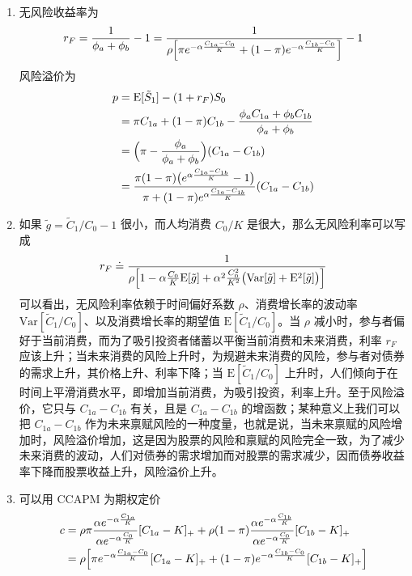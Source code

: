 \begin{solution}
\begin{enumerate}[label=(\alph*)]
\[\begin{aligned}
        \end{aligned}
    \]
    \item 无风险收益率为
    \[
        r_{F}=\frac{1}{\phi_{a}+\phi_{b}}-1=\frac{1}{\rho\Bigl[\pi e^{-\alpha\frac{C_{1a}-C_{0}}{K}}+(1-\pi)e^{-\alpha\frac{C_{1b}-C_{0}}{K}}\Bigr]}-1
    \]
    风险溢价为
    \[
        \begin{aligned}
            p&=\mathrm{E}[\tilde{S}_{1}]-(1+r_{F})S_{0}\\
            &=\pi C_{1a}+(1-\pi)C_{1b}-\frac{\phi_{a}C_{1a}+\phi_{b}C_{1b}}{\phi_{a}+\phi_{b}}\\
            &=\Bigl(\pi-\frac{\phi_{a}}{\phi_{a}+\phi_{b}}\Bigr)(C_{1a}-C_{1b})\\
            &=\frac{\pi(1-\pi)\bigl(e^{\alpha\frac{C_{1a}-C_{1b}}{K}}-1\bigr)}{\pi+(1-\pi)e^{\alpha\frac{C_{1a}-C_{1b}}{K}}}(C_{1a}-C_{1b})
        \end{aligned}
    \]
    \item 如果 $\tilde{g}=\tilde{C}_{1}/C_{0}-1$ 很小，而人均消费 $C_{0}/K$ 是很大，那么无风险利率可以写成
    \[
        r_{F}\doteq\frac{1}{\rho\Bigl[1-\alpha\frac{C_{0}}{K}\mathrm{E}[\tilde{g}]+\alpha^{2}\frac{C_{0}^{2}}{K^{2}}\bigl(\mathrm{Var}[\tilde{g}]+\mathrm{E}^{2}[\tilde{g}]\bigr)\Bigr]}
    \]
    可以看出，无风险利率依赖于时间偏好系数 $\rho$、消费增长率的波动率 $\mathrm{Var}[\tilde{C}_{1}/C_{0}]$、以及消费增长率的期望值 $\mathrm{E}[\tilde{C}_{1}/C_{0}]$。当 $\rho$ 减小时，参与者偏好于当前消费，而为了吸引投资者储蓄以平衡当前消费和未来消费，利率 $r_{F}$ 应该上升；当未来消费的风险上升时，为规避未来消费的风险，参与者对债券的需求上升，其价格上升、利率下降；当 $\mathrm{E}[\tilde{C}_{1}/C_{0}]$ 上升时，人们倾向于在时间上平滑消费水平，即增加当前消费，为吸引投资，利率上升。至于风险溢价，它只与 $C_{1a}-C_{1b}$ 有关，且是 $C_{1a}-C_{1b}$ 的增函数；某种意义上我们可以把 $C_{1a}-C_{1b}$ 作为未来禀赋风险的一种度量，也就是说，当未来禀赋的风险增加时，风险溢价增加，这是因为股票的风险和禀赋的风险完全一致，为了减少未来消费的波动，人们对债券的需求增加而对股票的需求减少，因而债券收益率下降而股票收益上升，风险溢价上升。
    \item 可以用 CCAPM 为期权定价
    \[
        \begin{aligned}
            c&=\rho\pi\frac{\alpha e^{-\alpha\frac{C_{1a}}{K}}}{\alpha e^{-\alpha\frac{C_{0}}{K}}}[C_{1a}-K]_{+}+\rho(1-\pi)\frac{\alpha e^{-\alpha\frac{C_{1b}}{K}}}{\alpha e^{-\alpha\frac{C_{0}}{K}}}[C_{1b}-K]_{+}\\
            &=\rho\Bigl[\pi e^{-\alpha\frac{C_{1a}-C_{0}}{K}}[C_{1a}-K]_{+}+(1-\pi)e^{-\alpha\frac{C_{1b}-C_{0}}{K}}[C_{1b}-K]_{+}\Bigr]
        \end{aligned}
    \]
\end{enumerate}
\end{solution}

